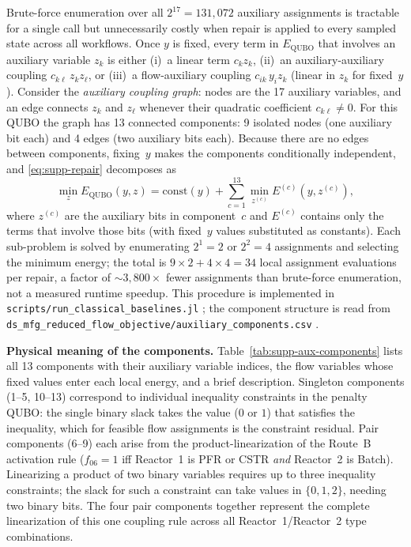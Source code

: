 \documentclass[10pt,letterpaper]{article}
\DeclareRobustCommand{\artifact}[1]{%
  {\begingroup\urlstyle{tt}\footnotesize\nolinkurl{#1}\endgroup}%
}
\begin{document}
Brute-force enumeration over all $2^{17} = 131{,}072$ auxiliary assignments is tractable for a single call but unnecessarily costly when repair is applied to every sampled state across all workflows.
Once $y$ is fixed, every term in $E_{\mathrm{QUBO}}$ that involves an auxiliary variable $z_k$ is either (i)~a linear term $c_k z_k$, (ii)~an auxiliary-auxiliary coupling $c_{k\ell}\,z_k z_\ell$, or (iii)~a flow-auxiliary coupling $c_{ik}\,y_i z_k$ (linear in $z_k$ for fixed~$y$).
Consider the \emph{auxiliary coupling graph}: nodes are the 17 auxiliary variables, and an edge connects $z_k$ and $z_\ell$ whenever their quadratic coefficient $c_{k\ell}\neq 0$.
For this QUBO the graph has 13 connected components: 9 isolated nodes (one auxiliary bit each) and 4 edges (two auxiliary bits each).
Because there are no edges between components, fixing~$y$ makes the components conditionally independent, and \eqref{eq:supp-repair} decomposes as
\begin{equation}
\min_{z} E_{\mathrm{QUBO}}(y, z) = \mathrm{const}(y) + \sum_{c=1}^{13} \min_{z^{(c)}} E^{(c)}(y, z^{(c)}),
\end{equation}
where $z^{(c)}$ are the auxiliary bits in component~$c$ and $E^{(c)}$ contains only the terms that involve those bits (with fixed~$y$ values substituted as constants).
Each sub-problem is solved by enumerating $2^1=2$ or $2^2=4$ assignments and selecting the minimum energy; the total is $9{\times}2 + 4{\times}4 = 34$ local assignment evaluations per repair, a factor of $\sim\!3{,}800\times$ fewer assignments than brute-force enumeration, not a measured runtime speedup.
This procedure is implemented in \artifact{scripts/run\_classical\_baselines.jl}; the component structure is read from \artifact{ds\_mfg\_reduced\_flow\_objective/auxiliary\_components.csv}.

\smallskip
\noindent\textbf{Physical meaning of the components.}
Table~\ref{tab:supp-aux-components} lists all 13 components with their auxiliary variable indices, the flow variables whose fixed values enter each local energy, and a brief description.
Singleton components (1--5, 10--13) correspond to individual inequality constraints in the penalty QUBO: the single binary slack takes the value ($0$ or $1$) that satisfies the inequality, which for feasible flow assignments is the constraint residual.
Pair components (6--9) each arise from the product-linearization of the Route~B activation rule ($f_{06}=1$ iff Reactor~1 is PFR or CSTR \emph{and} Reactor~2 is Batch).
Linearizing a product of two binary variables requires up to three inequality constraints; the slack for such a constraint can take values in $\{0,1,2\}$, needing two binary bits.
The four pair components together represent the complete linearization of this one coupling rule across all Reactor~1/Reactor~2 type combinations.
\end{document}
